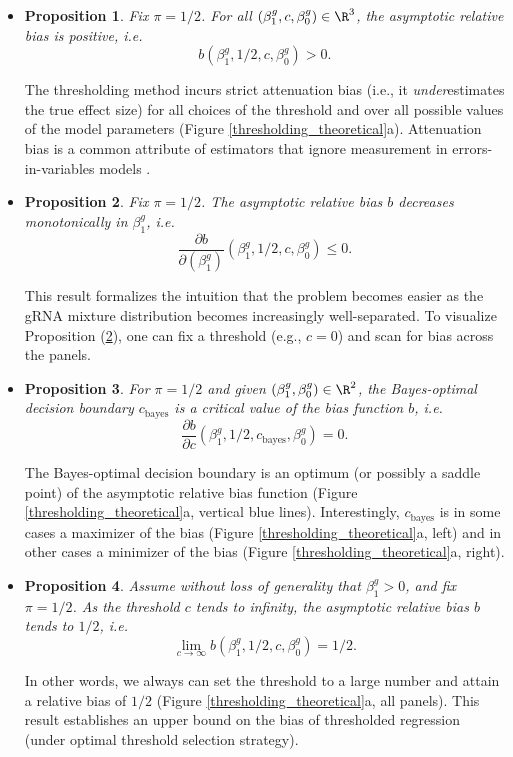 \documentclass[12pt]{article}
\newtheorem{proposition}{Proposition}
\begin{document}
\begin{itemize}
\item 
\begin{proposition}\label{prop:att_bias} Fix $\pi = 1/2$. For all $(\beta^g_1, c, \beta^g_0) \in \R^3$, the asymptotic relative bias is positive, i.e. 
$$b(\beta^g_1, 1/2, c, \beta^g_0) > 0.$$
\end{proposition}
The thresholding method incurs strict attenuation bias (i.e., it \textit{under}estimates the true effect size) for all choices of the threshold and over all possible values of the model parameters (Figure \ref{thresholding_theoretical}a). Attenuation bias is a common attribute of estimators that ignore measurement in errors-in-variables models \cite{Stefanski2000a}.
\item
\begin{proposition}\label{prop:monotonic} Fix $\pi = 1/2$. The asymptotic relative bias $b$ decreases monotonically in $\beta_1^g$, i.e.
	$$\frac{\partial b}{\partial(\beta^g_1)}\left(\beta^g_1, 1/2, c, \beta^g_0\right) \leq 0.$$
\end{proposition}
This result formalizes the intuition that the problem becomes easier as the gRNA mixture distribution becomes increasingly well-separated. To visualize Proposition (\ref{prop:monotonic}), one can fix a threshold (e.g., $c = 0$) and scan for bias across the panels.	
\item \begin{proposition}\label{prop:bayes_opt}
For $\pi = 1/2$ and given $(\beta^g_1, \beta^g_0) \in \R^2$, the Bayes-optimal decision boundary $c_\textrm{bayes}$ is a critical value of the bias function $b$, i.e.
$$ \frac{\partial b}{\partial c}\left(\beta^g_1, 1/2, c_\textrm{bayes}, \beta^g_0\right) = 0.$$
\end{proposition}
The Bayes-optimal decision boundary is an optimum (or possibly a saddle point) of the asymptotic relative bias function (Figure \ref{thresholding_theoretical}a, vertical blue lines). Interestingly, $c_\textrm{bayes}$ is in some cases a maximizer of the bias (Figure \ref{thresholding_theoretical}a, left) and in other cases a minimizer of the bias (Figure \ref{thresholding_theoretical}a, right).
\item
\begin{proposition}\label{prop:c_limit_half}
Assume without loss of generality that $\beta^g_1 > 0$, and fix $\pi = 1/2$. As the threshold $c$ tends to infinity, the asymptotic relative bias $b$ tends to $1/2$, i.e.
$$\lim_{c \to \infty} b(\beta^g_1, 1/2, c, \beta^g_0) = 1/2.$$
\end{proposition}
In other words, we always can set the threshold to a large number and attain a relative bias of $1/2$ (Figure \ref{thresholding_theoretical}a, all panels). This result establishes an upper bound on the bias of thresholded regression (under optimal threshold selection strategy).


\end{itemize}
\end{document}
